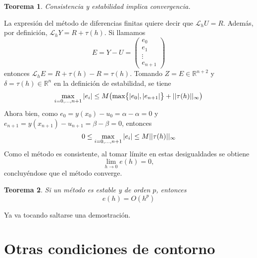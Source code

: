 \documentclass[11pt]{report}
\makeatletter
\renewenvironment{proof}[1][\proofname]{\par
  \pushQED{\qed}%
  \normalfont \topsep\z@skip %
  \trivlist
  \item[\hskip\labelsep
        \itshape
    #1\@addpunct{.}]\ignorespaces
}{%
  \popQED\endtrivlist\@endpefalse
}
\theoremstyle{mytheorem}
\newtheorem{theorem}{Teorema}
\theoremstyle{mydefinition}
\theoremstyle{myexample}
\let\oldproofname=\proofname
\renewcommand{\proofname}{\rm\bf{\oldproofname}}}
\newenvironment{ctheorem} %
  {\begin{mdframed}[
        linewidth=3pt,
        linecolor=c2,
        bottomline=false,
        topline=false,
        rightline=false,
        innerrightmargin=0pt,
        innertopmargin=0pt,
        innerbottommargin=0pt,
        innerleftmargin=1em, %
        skipabove=\baselineskip]
    \begin{theorem}}
  {\end{theorem}\end{mdframed}}
\newcommand{\R}{\mathbb R}
\makeatother
\begin{document}
\begin{ctheorem}
    Consistencia y estabilidad implica convergencia.
\end{ctheorem}

\begin{proof}
La expresión del método de diferencias finitas quiere decir que $\mathcal{L}_hU=R$. Además, por definición, $\mathcal{L}_hY=R+\tau(h)$. Si llamamos
\[E = Y-U= \left(\begin{array}{c}
    e_0 \\
    e_1 \\
    \vdots \\
    e_{n+1}
\end{array}\right)\]
entonces $\mathcal{L}_hE=R+\tau(h)-R=\tau(h)$. Tomando $Z = E \in \R^{n+2}$ y $\delta = \tau(h) \in \R^n$ en la definición de estabilidad, se tiene
\[\max_{i=0,\mathellipsis,n+1} |e_i| \leq M\bigl(\max\bigl\{|e_0|,|e_{n+1}|\bigr\}+||\tau(h)||_{\infty}\bigr)\]
Ahora bien, como $e_0 = y(x_0)-u_0=\alpha-\alpha =0$ y $e_{n+1} = y(x_{n+1})-u_{n+1}=\beta-\beta=0$, entonces
\[0 \leq \max_{i=0,\mathellipsis,n+1} |e_i| \leq M||\tau(h)||_{\infty}\]
Como el método es consistente, al tomar límite en estas desigualdades se obtiene
\[\lim_{h \to 0} e(h)=0,\]
concluyéndose que el método converge.
\end{proof}

\begin{ctheorem}
    Si un método es estable y de orden $p$, entonces \[e(h)=O(h^p)\]
\end{ctheorem}

\begin{proof}
    Ya va tocando saltarse una demostración.
\end{proof}

\section{Otras condiciones de contorno}
\end{document}
